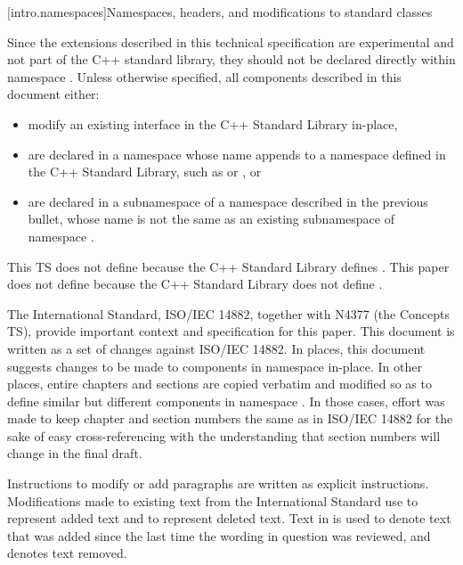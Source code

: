 {\color{addclr}
[intro.namespaces]{Namespaces, headers, and modifications to standard classes}

\pnum
Since the extensions described in this technical specification are experimental and not
part of the C++ standard library, they should not be declared directly within namespace
. Unless otherwise specified, all components described in this document either:

\begin{itemize}
\item modify an existing interface in the C++ Standard Library in-place,
\item are declared in a namespace whose name appends  to
a namespace defined in the C++ Standard Library, such as  or ,
or
\item are declared in a subnamespace of a namespace described in the previous bullet, whose
name is not the same as an existing subnamespace of namespace .
\end{itemize}

\enterexample This TS does not define  because
the C++ Standard Library defines . This paper does not define
 because the C++ Standard Library does not define
.\exitexample
}


\pnum
The International Standard, ISO/IEC 14882, together with N4377 (the Concepts TS),
provide important context and specification for this paper. This document is written
as a set of changes against ISO/IEC 14882. In places, this document suggests
changes to be made to components in namespace  in-place. In
other places, entire chapters and sections are copied verbatim and modified so as to
define similar but different components in namespace .
In those cases, effort was made to keep chapter and section numbers the same as in
ISO/IEC 14882 for the sake of easy cross-referencing with the understanding that
section numbers will change in the final draft.

\pnum
Instructions to modify or add paragraphs are written as explicit instructions.
Modifications made to existing text from the International Standard use
 to represent added text and  to
represent deleted text. Text in  is used to denote text that
was added since the last time the wording in question was reviewed, and
 denotes text removed.

